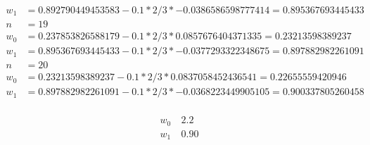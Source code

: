 \documentclass{report}
\begin{document}
\begin{equation}
\begin{split}
w_1 & = 0.892790449453583 - 0.1 * 2/3 * -0.0386586598777414 = 0.895367693445433\\
n & = 19\\
w_0 & = 0.237853826588179 - 0.1 * 2/3 * 0.0857676404371335 = 0.23213598389237\\
w_1 & = 0.895367693445433 - 0.1 * 2/3 * -0.0377293322348675 = 0.897882982261091\\
n & = 20\\
w_0 & = 0.23213598389237 - 0.1 * 2/3 * 0.0837058452436541 = 0.22655559420946\\
w_1 & = 0.897882982261091 - 0.1 * 2/3 * -0.0368223449905105 = 0.900337805260458\\
\end{split}
\end{equation}

\begin{equation} \label{eq1}
\begin{split}
w_0 & ~ 2.2\\
w_1 & ~ 0.90\\
\end{split}
\end{equation}
\end{document}
